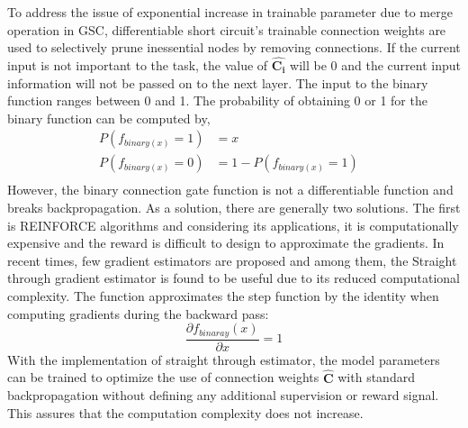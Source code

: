 \documentclass{article}
\let\oldhat\hat
\renewcommand{\hat}[1]{\oldhat{\mathbf{#1}}}
\begin{document}
To address the issue of exponential increase in trainable parameter due to merge operation in GSC, differentiable short circuit's trainable connection weights are used to selectively prune inessential nodes by removing connections.  If the current input is not important to the task, the value of $\hat{C_{i}}$ will be 0 and the current input information will not be passed on to the next layer. The input to the binary function ranges between 0 and 1. The probability of obtaining 0 or 1 for the binary function can be computed by,
\begin{equation}
\label{eq:ffn_math_representation}
\begin{aligned}
   P(f_{binary(x)}=1) &=x&\\
   P(f_{binary(x)}=0) &=1-P(f_{binary(x)}=1)&\\   
\end{aligned}
\end{equation}
However, the binary connection gate function is not a differentiable function and breaks backpropagation. As a solution, there are generally two solutions. The first is REINFORCE algorithms \cite{Williams1992SimpleSG} and considering its applications, it is computationally expensive and the reward is difficult to design to approximate the gradients. In recent times, few gradient estimators are proposed and among them, the Straight through gradient estimator \cite{Bengio2013EstimatingOP} is found to be useful due to its reduced computational complexity. The function approximates the step function by the identity when computing gradients during the backward pass:
\begin{equation}
\frac{\partial{f_{binaray}(x)}}{\partial x}=1
\end{equation}
With the implementation of straight through estimator, the model parameters can be trained to optimize the use of connection weights $\hat{C}$ with standard backpropagation without defining any additional supervision or reward signal. This assures that the computation complexity does not increase.
\end{document}
